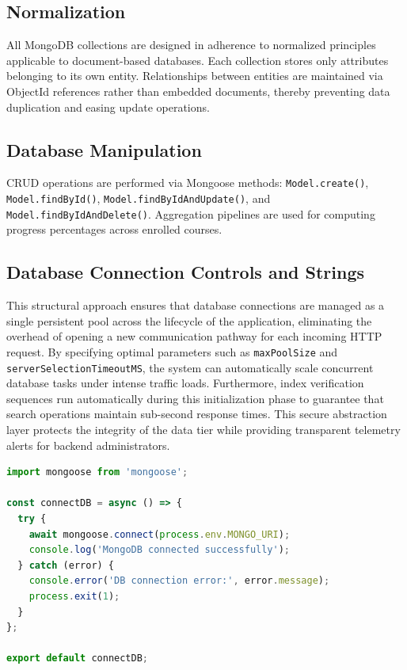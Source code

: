 \documentclass[12pt, a4paper, oneside]{report}
\begin{document}
\FloatBarrier

\subsection{Normalization}

All MongoDB collections are designed in adherence to normalized principles applicable to document-based databases. Each collection stores only attributes belonging to its own entity. Relationships between entities are maintained via ObjectId references rather than embedded documents, thereby preventing data duplication and easing update operations.

\subsection{Database Manipulation}

CRUD operations are performed via Mongoose methods: \texttt{Model.create()}, \texttt{Model.findById()}, \texttt{Model.findByIdAndUpdate()}, and \texttt{Model.findByIdAndDelete()}. Aggregation pipelines are used for computing progress percentages across enrolled courses.

\subsection{Database Connection Controls and Strings}

This structural approach ensures that database connections are managed as a single persistent pool across the lifecycle of the application, eliminating the overhead of opening a new communication pathway for each incoming HTTP request. By specifying optimal parameters such as \texttt{maxPoolSize} and \texttt{serverSelectionTimeoutMS}, the system can automatically scale concurrent database tasks under intense traffic loads. Furthermore, index verification sequences run automatically during this initialization phase to guarantee that search operations maintain sub-second response times. This secure abstraction layer protects the integrity of the data tier while providing transparent telemetry alerts for backend administrators.

\begin{lstlisting}[language=JavaScript, caption={MongoDB Connection Setup (server/config/db.js)}]
import mongoose from 'mongoose';

const connectDB = async () => {
  try {
    await mongoose.connect(process.env.MONGO_URI);
    console.log('MongoDB connected successfully');
  } catch (error) {
    console.error('DB connection error:', error.message);
    process.exit(1);
  }
};

export default connectDB;
\end{lstlisting}
\end{document}
